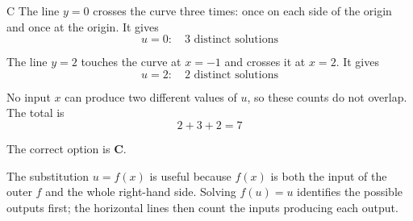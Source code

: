 \documentclass[11pt,a4paper]{article}
\begin{document}
\begin{enumerate}[label=\textbf{\arabic*.},leftmargin=*,itemsep=0pt,start=19]
\begin{djsSolution}{C}
The line $y=0$ crosses the curve three times: once on each side of the origin and once at the origin. It gives
\[
u=0:\quad 3\text{ distinct solutions}
\]

The line $y=2$ touches the curve at $x=-1$ and crosses it at $x=2$. It gives
\[
u=2:\quad 2\text{ distinct solutions}
\]

No input $x$ can produce two different values of $u$, so these counts do not overlap. The total is
\[
2+3+2=7
\]

The correct option is \textbf{C}.

The substitution $u=f(x)$ is useful because $f(x)$ is both the input of the outer $f$ and the whole right-hand side. Solving $f(u)=u$ identifies the possible outputs first; the horizontal lines then count the inputs producing each output. 
\end{djsSolution}
\end{enumerate}
\clearpage
\thispagestyle{djssolutions}
\vspace*{8pt}
\end{document}
